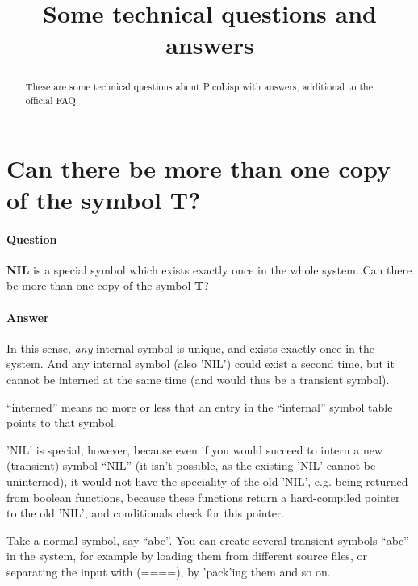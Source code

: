 \title{Some technical questions and answers}

\maketitle

\begin{abstract}
  These are some technical questions about PicoLisp with answers,
  additional to the official FAQ.
\end{abstract}


\section{Can there be more than one copy of the symbol \textbf{T}?}
\label{sec:tj-fix-labels-some-technical-questions-and-answers}

\paragraph{Question}
\label{sec:dfs}

\textbf{NIL} is a special symbol which exists exactly once in the whole system.
Can there be more than one copy of the symbol \textbf{T}?


\paragraph{Answer}
\label{sec:dfs}

In this sense, \textit{any} internal symbol is unique, and exists exactly once
in the system. And any internal symbol (also 'NIL') could exist a second time,
but it cannot be interned at the same time (and would thus be a transient
symbol).

``interned'' means no more or less that an entry in the ``internal'' symbol table
points to that symbol.

'NIL' is special, however, because even if you would succeed to intern a new
(transient) symbol ``NIL'' (it isn't possible, as the existing 'NIL' cannot be
uninterned), it would not have the speciality of the old 'NIL', e.g. being
returned from boolean functions, because these functions return a hard-compiled
pointer to the old 'NIL', and conditionals check for this pointer.

Take a normal symbol, say ``abc''. You can create several transient symbols ``abc''
in the system, for example by loading them from different source files, or
separating the input with (====), by 'pack'ing them and so on.

